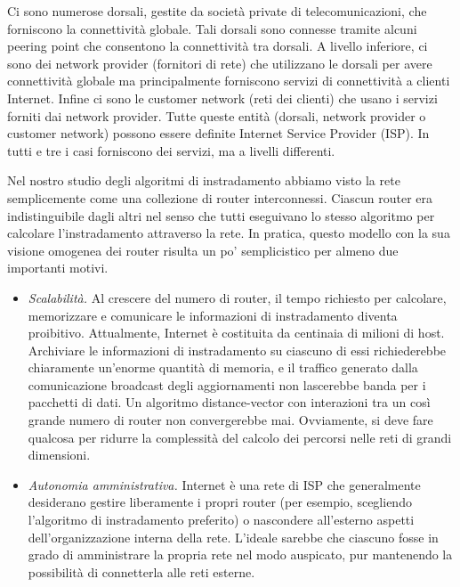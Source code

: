 Ci sono numerose dorsali, gestite da società private di telecomunicazioni, che forniscono la connettività globale. Tali dorsali sono connesse tramite alcuni peering point che consentono la connettività tra dorsali. A livello inferiore, ci sono dei network provider (fornitori di rete) che utilizzano le dorsali per avere connettività globale ma principalmente forniscono servizi di connettività a clienti Internet. Infine ci sono le customer network (reti dei clienti) che usano i servizi forniti dai network provider. Tutte queste entità (dorsali, network provider o customer network) possono essere definite Internet Service Provider (ISP). In tutti e tre i casi forniscono dei servizi, ma a livelli differenti.

Nel nostro studio degli algoritmi di instradamento abbiamo visto la rete semplicemente come una collezione di router interconnessi. Ciascun router era indistinguibile dagli altri nel senso che tutti eseguivano lo stesso algoritmo per calcolare l’instradamento attraverso la rete. In pratica, questo modello con la sua visione omogenea dei router risulta un po’ semplicistico per almeno due importanti motivi.

\begin{itemize}
    \item \textit{Scalabilità.} Al crescere del numero di router, il tempo richiesto per calcolare, memorizzare e comunicare le informazioni di instradamento diventa proibitivo. Attualmente, Internet è costituita da centinaia di milioni di host. Archiviare le informazioni di instradamento su ciascuno di essi richiederebbe chiaramente un’enorme quantità di memoria, e il traffico generato dalla comunicazione broadcast degli aggiornamenti non lascerebbe banda per i pacchetti di dati. Un algoritmo distance-vector con interazioni tra un così grande numero di router non convergerebbe mai. Ovviamente, si deve fare qualcosa per ridurre la complessità del calcolo dei percorsi nelle reti di grandi dimensioni.
    \item \textit{Autonomia amministrativa.} Internet è una rete di ISP che generalmente desiderano gestire liberamente i propri router (per esempio, scegliendo l’algoritmo di instradamento preferito) o nascondere all’esterno aspetti dell’organizzazione interna della rete. L’ideale sarebbe che ciascuno fosse in grado di amministrare la propria rete nel modo auspicato, pur mantenendo la possibilità di connetterla alle reti esterne.
\end{itemize}

